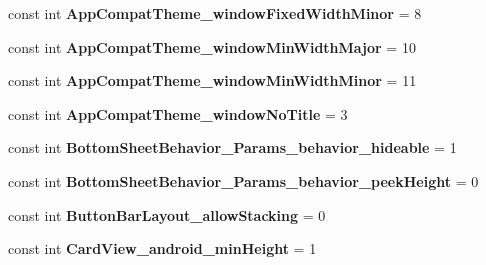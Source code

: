 \begin{DoxyCompactItemize}
const int {\bfseries App\+Compat\+Theme\+\_\+window\+Fixed\+Width\+Minor} = 8
\item 
\mbox{\label{class_sample_app_1_1_droid_1_1_resource_1_1_styleable_a0f9ba64dcb4ac18ecd87439dc829d628}} 
const int {\bfseries App\+Compat\+Theme\+\_\+window\+Min\+Width\+Major} = 10
\item 
\mbox{\label{class_sample_app_1_1_droid_1_1_resource_1_1_styleable_af2657dbd2bdd7068ae0a55ae070e1f0f}} 
const int {\bfseries App\+Compat\+Theme\+\_\+window\+Min\+Width\+Minor} = 11
\item 
\mbox{\label{class_sample_app_1_1_droid_1_1_resource_1_1_styleable_a151a0adda9f725ef40154f99eede7719}} 
const int {\bfseries App\+Compat\+Theme\+\_\+window\+No\+Title} = 3
\item 
\mbox{\label{class_sample_app_1_1_droid_1_1_resource_1_1_styleable_a509c1e35aa30b0507ead3e5aa7ed2ad4}} 
const int {\bfseries Bottom\+Sheet\+Behavior\+\_\+\+Params\+\_\+behavior\+\_\+hideable} = 1
\item 
\mbox{\label{class_sample_app_1_1_droid_1_1_resource_1_1_styleable_a6548a88ea93f8be09944c997218f4ea4}} 
const int {\bfseries Bottom\+Sheet\+Behavior\+\_\+\+Params\+\_\+behavior\+\_\+peek\+Height} = 0
\item 
\mbox{\label{class_sample_app_1_1_droid_1_1_resource_1_1_styleable_a3bddb3c270700718f5f9ccb17a6821bb}} 
const int {\bfseries Button\+Bar\+Layout\+\_\+allow\+Stacking} = 0
\item 
\mbox{\label{class_sample_app_1_1_droid_1_1_resource_1_1_styleable_a386a3b9265ce8723da4b9185b527ac7b}} 
const int {\bfseries Card\+View\+\_\+android\+\_\+min\+Height} = 1
\item 
\mbox{\label{class_sample_app_1_1_droid_1_1_resource_1_1_styleable_aa0ff67fa93e94b9d99c6b122f9de2c2d}} 

\end{DoxyCompactItemize}
